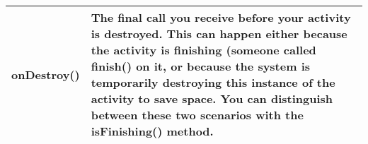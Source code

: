 \begin{table}[H]
\begin{tabular}{|l|p{12cm}|}
onDestroy()     &   The final call you receive before your activity is destroyed. This can happen either because the activity is finishing (someone called finish() on it, or because the system is temporarily destroying this instance of the activity to save space. You can distinguish between these two scenarios with the isFinishing() method. \newline \\ \hline

\end{tabular}
\end{table}